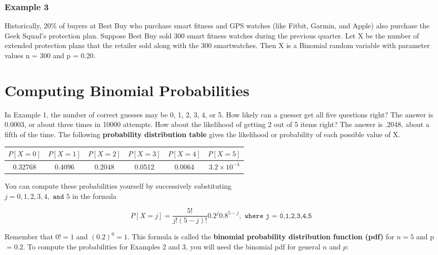 \documentclass[11pt]{book}\usepackage[]{graphicx}\usepackage[]{color}
\begin{document}
\subsubsection{Example 3} Historically, 20\% of buyers at Best Buy who purchase smart fitness and GPS watches (like Fitbit, Garmin, and Apple) also purchase the Geek Squad’s protection plan.  Suppose Best Buy sold 300 smart fitness watches during the previous quarter.  Let X be the number of extended protection plans that the retailer sold along with the 300 smartwatches.  Then X is a Binomial random variable with parameter values n = 300 and p = 0.20.

\section{Computing Binomial Probabilities}

In Example 1, the number of correct guesses may be 0, 1, 2, 3, 4, or 5.  How likely can a guesser get all five questions right? The answer is 0.0003, or about three times in 10000 attempts.  How about the likelihood of getting 2 out of 5 items right?  The answer is .2048, about a fifth of the time.  The following \textbf{probability distribution table} gives the likelihood or probability of each possible value of X.



\begin{center}
\begin{tabular}{@{} cccccc @{}} \hline
$P[X = 0]$ & $P[X = 1]$ & $P[X = 2]$ & $P[X = 3]$ & $P[X = 4]$ & $P[X = 5]$ \\ \hline
0.32768 & 0.4096 & 0.2048 & 0.0512 & 0.0064 & \ensuremath{3.2\times 10^{-4}} \\ \hline
\end{tabular}
\end{center}

You can compute these probabilities yourself by successively substituting \\ $j = 0, 1, 2, 3, 4, \texttt{ and } 5$ in the formula

\begin{equation*}
 P[ X = j] = \frac{5!}{j! (5 - j)!} 0.2^j 0.8^{5 - j}, \texttt{ where j = 0,1,2,3,4,5 }
 \end{equation*}

Remember that $0! = 1$ and $(0.2)^0 = 1$.  This formula is called the \textbf{binomial probability distribution function (pdf)} for $n = 5$ and p$ = 0.2$.  To compute the probabilities for Examples 2 and 3, you will need the binomial pdf for general $n$ and $p$:
\end{document}
